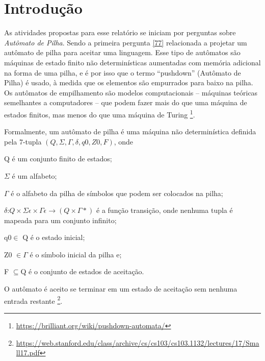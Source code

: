 \documentclass[
	12pt,				%
	openright,			%
	twoside,			%
	a4paper,			%
	english,			%
	french,				%
	spanish,			%
	brazil,				%
	]{abntex2}
\begin{document}
\chapter*[Introdução]{Introdução}
As atividades propostas para esse relatório se iniciam por perguntas sobre \emph{Autômato de Pilha}. Sendo a primeira pergunta \ref{77} relacionada a projetar um autômato de pilha para aceitar uma linguagem. Esse tipo de autômatos são máquinas de estado finito não determinísticas aumentadas com memória adicional na forma de uma pilha, e é por isso que o termo “pushdown” (Autômato de Pilha) é usado, à medida que os elementos são empurrados para baixo na pilha. Os autômatos de empilhamento são modelos computacionais – máquinas teóricas semelhantes a computadores – que podem fazer mais do que uma máquina de estados finitos, mas menos do que uma máquina de Turing \footnote{\url{https://brilliant.org/wiki/pushdown-automata/}}.

Formalmente, um autômato de pilha é uma máquina não determinística definida pela 7-tupla $(Q, \Sigma, \Gamma,  \delta, q0 , Z0 , F)$, onde

  \textsf{Q} é um conjunto finito de estados;

  \textsf{$\Sigma$} é um alfabeto;

  \textsf{$\Gamma$} é o alfabeto da pilha de símbolos que podem ser colocados na pilha;

  \textsf{$\delta$}:$ Q \times \Sigma\epsilon \times \Gamma \epsilon \rightarrow (Q \times \Gamma*)$ é a função transição, onde nenhuma tupla é mapeada para um conjunto infinito;

  \textsf{q0}$ \in$ Q é o estado inicial;

  \textsf{Z0} $\in \Gamma$ é o símbolo inicial da pilha e;

  \textsf{F} $\subseteq $Q é o conjunto de estados de aceitação.

O autômato é aceito se terminar em um estado de aceitação sem nenhuma entrada restante \footnote{\url{https://web.stanford.edu/class/archive/cs/cs103/cs103.1132/lectures/17/Small17.pdf}}.
\end{document}
